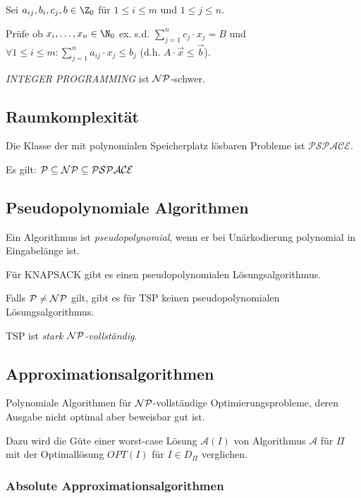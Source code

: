 Sei $a_{ij}, b_i, c_j, b \in \Z_0$ für $1 \leq i \leq m$ und $1 \leq j \leq n$.

Prüfe ob $x_i, \dots, x_n \in \N_0$ ex. s.d. $\sum_{j=1}^n c_j \cdot x_j = B$ und $\forall 1 \leq i \leq m : \sum_{j=1}^n a_{ij} \cdot x_j \leq b_j$ (d.h. $A \cdot \vec{x} \leq \vec{b}$).

\emph{INTEGER PROGRAMMING} ist $\mathcal{NP}$-schwer.

\subsection*{Raumkomplexität}

Die Klasse der mit polynomialen Speicherplatz lösbaren Probleme ist $\mathcal{PSPACE}$.

\spacing

Es gilt: $\mathcal{P} \subseteq \mathcal{NP} \subseteq \mathcal{PSPACE}$

\subsection*{Pseudopolynomiale Algorithmen}

Ein Algorithmus ist \emph{pseudopolynomial}, wenn er bei Unärkodierung polynomial in Eingabelänge ist.

\spacing

Für KNAPSACK gibt es einen pseudopolynomialen Lösungsalgorithmus.

Falls $\mathcal{P} \neq \mathcal{NP}$ gilt, gibt es für TSP keinen pseudopolynomialen Lösungsalgorithmus.

TSP ist \emph{stark $\mathcal{NP}$-vollständig}.

\subsection*{Approximationsalgorithmen}

Polynomiale Algorithmen für $\mathcal{NP}$-vollständige Optimierungsprobleme, deren Ausgabe nicht optimal aber beweisbar gut ist.

\spacing

Dazu wird die Güte einer worst-case Lösung $\mathcal{A}(I)$ von Algorithmus $\mathcal{A}$ für $\Pi$ mit der Optimallösung $OPT(I)$ für $I \in D_\Pi$ verglichen.

\subsubsection*{Absolute Approximationsalgorithmen}

